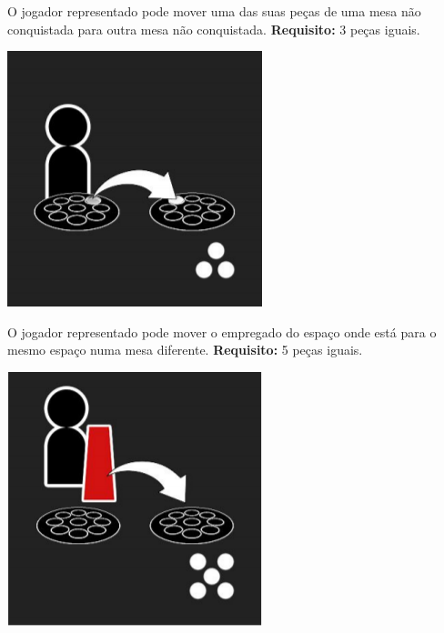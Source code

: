 \documentclass[a4paper]{article}
\begin{document}
\begin{itemize}

\begin{minipage}{0.58\textwidth}
\item O jogador representado pode mover uma das suas peças de uma mesa não conquistada para outra mesa não conquistada. \newline
\textbf{Requisito:} 3 peças iguais.
\end{minipage}
\hspace{4mm}
\begin{minipage}{0.58\textwidth}
\includegraphics[scale=0.2]{black-move.png}
\end{minipage}

\begin{minipage}{0.58\textwidth}
\item O jogador representado pode mover o empregado do espaço onde está para o mesmo espaço numa mesa diferente.  \newline
\textbf{Requisito:} 5 peças iguais.
\end{minipage}
\hspace{4mm}
\begin{minipage}{0.58\textwidth}
\includegraphics[scale=0.2]{black-waiter.png}
\end{minipage}


\end{itemize}
\end{document}
